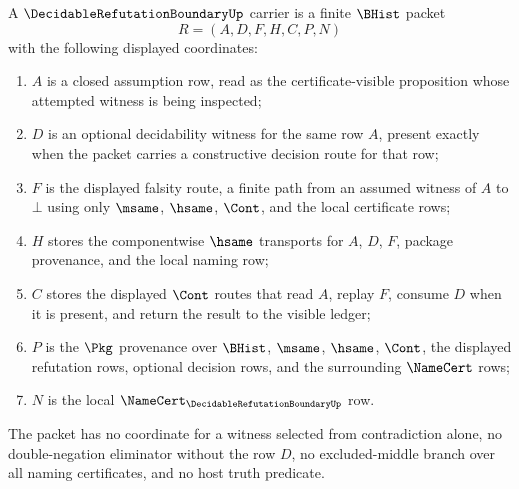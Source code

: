 \begin{definition}
\label{def:decidable-refutation-boundary-carrier}
A $\DecidableRefutationBoundaryUp$ carrier is a finite $\BHist$ packet
$$
R=(A,D,F,H,C,P,N)
$$
with the following displayed coordinates:
\begin{enumerate}
\item $A$ is a closed assumption row, read as the certificate-visible proposition whose attempted witness is being inspected;
\item $D$ is an optional decidability witness for the same row $A$, present exactly when the packet carries a constructive decision route for that row;
\item $F$ is the displayed falsity route, a finite path from an assumed witness of $A$ to $\bot$ using only $\msame$, $\hsame$, $\Cont$, and the local certificate rows;
\item $H$ stores the componentwise $\hsame$ transports for $A$, $D$, $F$, package provenance, and the local naming row;
\item $C$ stores the displayed $\Cont$ routes that read $A$, replay $F$, consume $D$ when it is present, and return the result to the visible ledger;
\item $P$ is the $\Pkg$ provenance over $\BHist$, $\msame$, $\hsame$, $\Cont$, the displayed refutation rows, optional decision rows, and the surrounding $\NameCert$ rows;
\item $N$ is the local $\NameCert_{\DecidableRefutationBoundaryUp}$ row.
\end{enumerate}
The packet has no coordinate for a witness selected from contradiction alone, no double-negation eliminator without the row $D$, no excluded-middle branch over all naming certificates, and no host truth predicate.
\end{definition}

